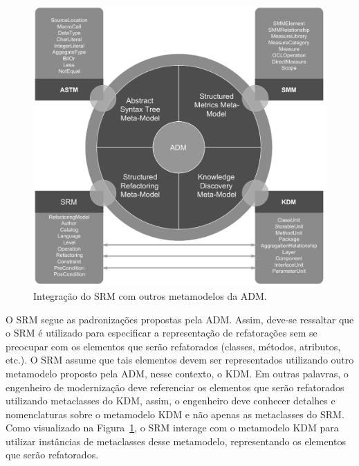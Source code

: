 \begin{figure}[h]
	\centering
	\caption{Integração do SRM com outros metamodelos da ADM.}
	\label{fig:refactoring_metamodel}
	\includegraphics[scale=0.6]{images/SRM2Formatted}
	\fautor
\end{figure}

O SRM segue as padronizações propostas pela ADM. Assim, deve-se ressaltar que o SRM é utilizado para especificar a representação de refatorações sem se preocupar com os elementos que serão refatorados (classes, métodos, atributos, etc.). O SRM assume que tais elementos devem ser representados utilizando outro metamodelo proposto pela ADM, nesse contexto, o KDM. Em outras palavras, o engenheiro de modernização deve referenciar os elementos que serão refatorados utilizando metaclasses do KDM, assim, o engenheiro deve conhecer detalhes e nomenclaturas sobre o metamodelo KDM e não apenas as metaclasses do SRM. Como visualizado na Figura~\ref{fig:refactoring_metamodel}, o SRM interage com o metamodelo KDM para utilizar instâncias de metaclasses desse metamodelo, representando os elementos que serão refatorados.

